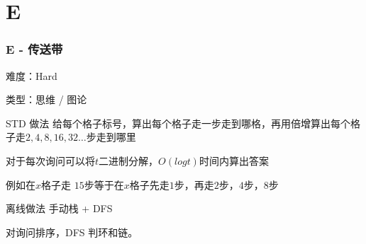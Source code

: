 \section{E}
\begin{frame}
\frametitle{E - 传送带}
难度：Hard

类型：思维 / 图论

\begin{block}{STD 做法}
给每个格子标号，算出每个格子走一步走到哪格，再用倍增算出每个格子走$2 , 4 , 8 , 16 ,32 \dots$步走到哪里

对于每次询问可以将$t$二进制分解，$O(log t)$时间内算出答案

例如在$ x $格子走 $ 15 $步等于在$ x $格子先走$ 1 $步，再走$2$步，$4$步，$8$步
\end{block}

\begin{block}{离线做法}
    手动栈 + DFS

    对询问排序，DFS 判环和链。
\end{block}

\end{frame}